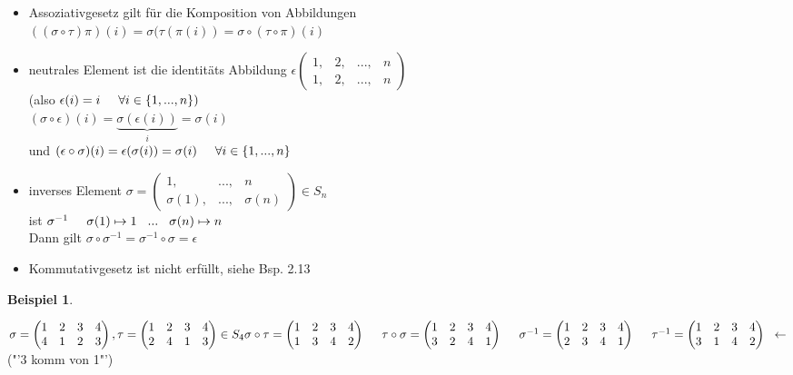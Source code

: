 \documentclass[a4paper,11pt]{article}
\newtheorem{bsp}[definition]{Beispiel}
\begin{document}
\begin{itemize}
\item Assoziativgesetz gilt für die Komposition von Abbildungen \\
$((\sigma\circ\tau)\pi)(i)=\sigma(\tau(\pi(i))=\sigma\circ(\tau\circ\pi)(i)$
\item neutrales Element ist die identitäts Abbildung $\epsilon\begin{pmatrix}1,&2,&...,&n\\1,&2,&...,&n\end{pmatrix}$\\
(also $\epsilon(i)=i\hspace{5mm}\forall i\in\{1,...,n\})$ \\
$(\sigma\circ\epsilon)(i)=\underbrace{\sigma(\epsilon(i))}_{i}=\sigma(i)$ \\
und $(\epsilon\circ\sigma)(i)=\epsilon(\sigma(i))=\sigma(i)\hspace{5mm}\forall i\in\{1,...,n\}$
\item inverses Element $\sigma=\begin{pmatrix}1,&...,&n\\\sigma(1),&...,&\sigma(n)\end{pmatrix}\in S_n$ \\
ist $\sigma^{-1}\hspace{5mm}\sigma(1)\mapsto 1\hspace{3mm}...\hspace{3mm}\sigma(n)\mapsto n$\\
Dann gilt $\sigma\circ\sigma^{-1}=\sigma^{-1}\circ\sigma=\epsilon$
\item Kommutativgesetz ist nicht erfüllt, siehe Bsp. 2.13
\end{itemize}
\newpage
\begin{bsp}
\end{bsp}
$\sigma=\begin{pmatrix}1&2&3&4\\4&1&2&3\end{pmatrix}, \tau=\begin{pmatrix}1&2&3&4\\2&4&1&3\end{pmatrix}\in S_4 \\
\sigma\circ\tau=\begin{pmatrix}1&2&3&4\\1&3&4&2\end{pmatrix}\hspace{5mm}\tau\circ\sigma=\begin{pmatrix}1&2&3&4\\3&2&4&1\end{pmatrix}\hspace{5mm}\sigma^{-1}=\begin{pmatrix}1&2&3&4\\2&3&4&1\end{pmatrix}\hspace{5mm}\tau^{-1}=\begin{pmatrix}1&2&3&4\\3&1&4&2\end{pmatrix}\hspace{2mm}\leftarrow $("'3 komm von 1"') \\
\end{document}
